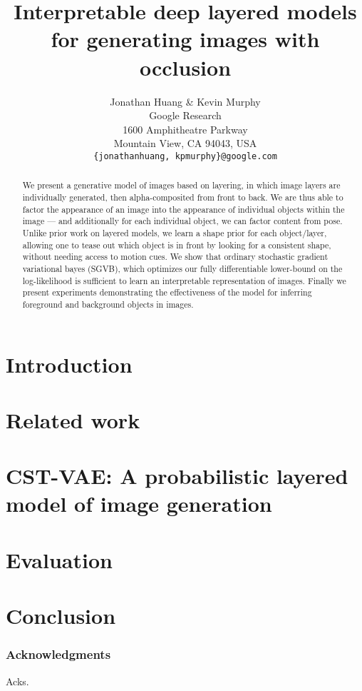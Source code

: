\documentclass{article} %
\title{Interpretable deep layered models for generating images with occlusion}
\author{Jonathan Huang \& Kevin Murphy \\
Google Research \\
1600 Amphitheatre Parkway \\
Mountain View, CA 94043, USA\\
\texttt{\{jonathanhuang, kpmurphy\}@google.com}
}
\begin{document}
\maketitle

\begin{abstract}
We present a generative model of images based on layering,
in which image layers are individually generated, then alpha-composited
from  front to back.  We are thus able to factor the appearance
of an image into the appearance of individual objects within the image --- and additionally for
each individual object, we can factor content from pose.  
Unlike prior work on layered models, we learn a shape prior for each object/layer, allowing one to
tease out which object is in front by looking for a consistent shape, without needing access to motion cues.
We show that ordinary stochastic gradient variational bayes (SGVB), which optimizes our fully differentiable
lower-bound on the log-likelihood is sufficient to learn an interpretable representation of images.
Finally we present experiments demonstrating the effectiveness of the model for inferring foreground
and background objects in images.
\end{abstract}

\section{Introduction}


\section{Related work}


\section{CST-VAE: A probabilistic layered model of image generation}


\section{Evaluation}


\section{Conclusion}


%

\subsubsection*{Acknowledgments}

Acks.




\end{document}
